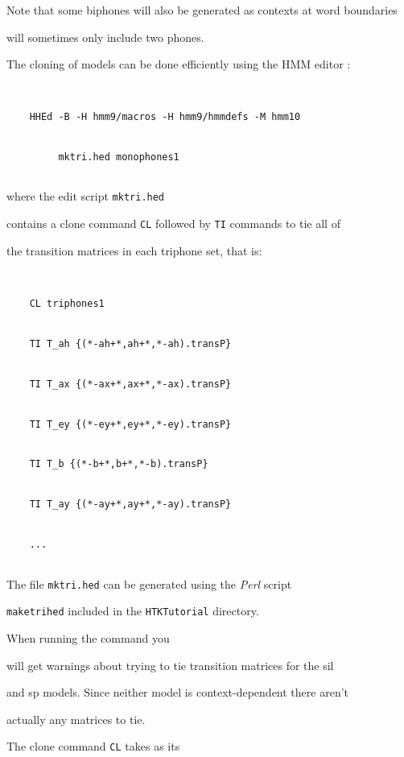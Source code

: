 Note that some biphones will also be generated as contexts at word boundaries


will sometimes only include two phones.





The cloning of models can be done efficiently using the HMM editor :


\begin{verbatim}


    HHEd -B -H hmm9/macros -H hmm9/hmmdefs -M hmm10 


         mktri.hed monophones1


\end{verbatim}


where the edit script \texttt{mktri.hed}


contains a clone command \texttt{CL} followed by \texttt{TI} commands to tie all of


the transition matrices in each triphone set, that is:


\begin{verbatim}


    CL triphones1


    TI T_ah {(*-ah+*,ah+*,*-ah).transP}


    TI T_ax {(*-ax+*,ax+*,*-ax).transP}


    TI T_ey {(*-ey+*,ey+*,*-ey).transP}


    TI T_b {(*-b+*,b+*,*-b).transP}


    TI T_ay {(*-ay+*,ay+*,*-ay).transP}


    ...


\end{verbatim}  


The file \texttt{mktri.hed} can be generated using the {\em Perl} script


\texttt{maketrihed} included in the \texttt{HTKTutorial} directory.


When running the  command you


will get warnings about trying to tie transition matrices for the sil


and sp models. Since neither model is context-dependent there aren't


actually any matrices to tie.





The clone command \texttt{CL} takes as its


